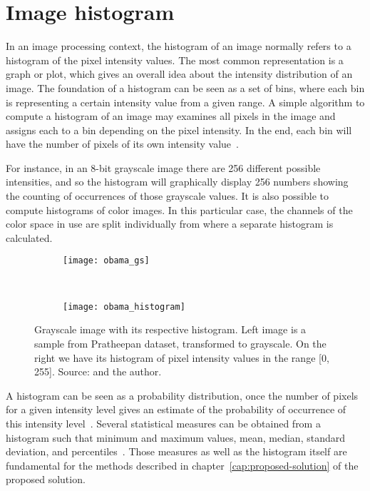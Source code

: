 \section{Image histogram}
\label{sec:image_histogram}
In an image processing context, the histogram of an image normally refers to a histogram of the pixel intensity values. The most common representation is a graph or plot, which gives an overall idea about the intensity distribution of an image. The foundation of a histogram can be seen as a set of bins, where each bin is representing a certain intensity value from a given range. A simple algorithm to compute a histogram of an image may examines all pixels in the image and assigns each to a bin depending on the pixel intensity. In the end, each bin will have the number of pixels of its own intensity value~\citep{gonzalez:02}.

For instance, in an 8-bit grayscale image there are 256 different possible intensities, and so the histogram will graphically display 256 numbers showing the counting of occurrences of those grayscale values. It is also possible to compute histograms of color images. In this particular case, the channels of the color space in use are split individually from where a separate histogram is calculated.

\begin{figure}[H]
    \centering
    \begin{subfigure}[t]{0.4\textwidth}
        \texttt{[image: obama\_gs]}
    \end{subfigure}
    ~
    \begin{subfigure}[t]{0.54\textwidth}
        \texttt{[image: obama\_histogram]}
    \end{subfigure}
    \caption[Grayscale image with its respective histogram]{Grayscale image with its respective histogram. Left image is a sample from Pratheepan dataset, transformed to grayscale. On the right we have its histogram of pixel intensity values in the range [0, 255]. Source: \citet{tan:12} and the author.}
    \label{fig:obama_hist}
\end{figure}

A histogram can be seen as a probability distribution, once the number of pixels for a given intensity level gives an estimate of the probability of occurrence of this intensity level~\citep{gonzalez:02}. Several statistical measures can be obtained from a histogram such that minimum and maximum values, mean, median, standard deviation, and percentiles~\citep{pedrini:08}. Those measures as well as the histogram itself are fundamental for the methods described in chapter~\ref{cap:proposed-solution} of the proposed solution.



